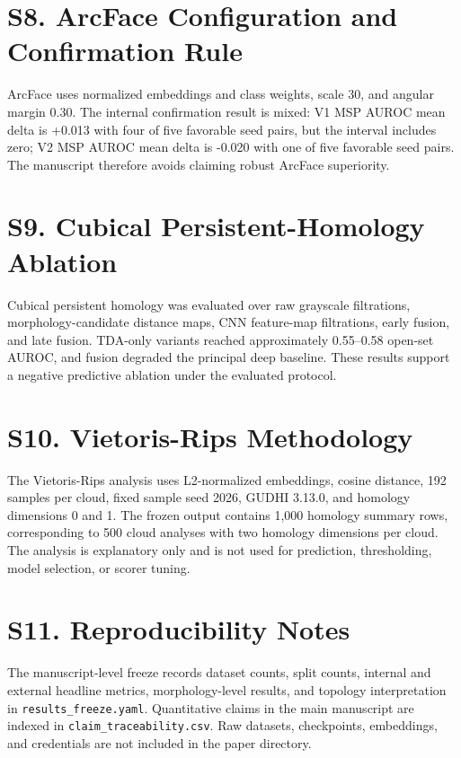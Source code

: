 \documentclass[11pt]{article}
\begin{document}
\section*{S8. ArcFace Configuration and Confirmation Rule}

ArcFace uses normalized embeddings and class weights, scale 30, and angular margin 0.30. The internal confirmation result is mixed: V1 MSP AUROC mean delta is +0.013 with four of five favorable seed pairs, but the interval includes zero; V2 MSP AUROC mean delta is -0.020 with one of five favorable seed pairs. The manuscript therefore avoids claiming robust ArcFace superiority.

\section*{S9. Cubical Persistent-Homology Ablation}

Cubical persistent homology was evaluated over raw grayscale filtrations, morphology-candidate distance maps, CNN feature-map filtrations, early fusion, and late fusion. TDA-only variants reached approximately 0.55--0.58 open-set AUROC, and fusion degraded the principal deep baseline. These results support a negative predictive ablation under the evaluated protocol.

\section*{S10. Vietoris-Rips Methodology}

The Vietoris-Rips analysis uses L2-normalized embeddings, cosine distance, 192 samples per cloud, fixed sample seed 2026, GUDHI 3.13.0, and homology dimensions 0 and 1. The frozen output contains 1,000 homology summary rows, corresponding to 500 cloud analyses with two homology dimensions per cloud. The analysis is explanatory only and is not used for prediction, thresholding, model selection, or scorer tuning.

\section*{S11. Reproducibility Notes}

The manuscript-level freeze records dataset counts, split counts, internal and external headline metrics, morphology-level results, and topology interpretation in \texttt{results\_freeze.yaml}. Quantitative claims in the main manuscript are indexed in \texttt{claim\_traceability.csv}. Raw datasets, checkpoints, embeddings, and credentials are not included in the paper directory.
\end{document}
